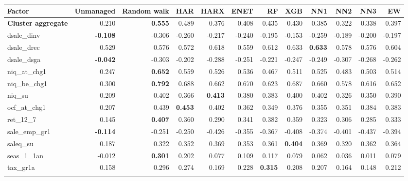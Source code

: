 \begin{landscape}
\begin{longtable}{>{\raggedright\arraybackslash}p{2.6cm}rrrrrrrrrrr}
\hline
Factor & Unmanaged & Random walk & HAR & HARX & ENET & RF & XGB & NN1 & NN2 & NN3 & EW \\
\hline
\textbf{Cluster aggregate} & 0.210 & \textbf{0.555} & 0.489 & 0.376 & 0.408 & 0.435 & 0.430 & 0.385 & 0.322 & 0.338 & 0.397 \\
dsale\_dinv & \textbf{-0.108} & -0.306 & -0.260 & -0.217 & -0.240 & -0.195 & -0.153 & -0.259 & -0.189 & -0.200 & -0.197 \\
dsale\_drec & 0.529 & 0.576 & 0.572 & \cellcolor{blue!10}0.618 & 0.559 & \cellcolor{blue!10}0.612 & \cellcolor{blue!10}0.633 & \textbf{\cellcolor{blue!10}0.633} & \cellcolor{blue!10}0.578 & \cellcolor{blue!10}0.576 & \cellcolor{blue!10}0.604 \\
dsale\_dsga & \textbf{-0.042} & -0.303 & -0.202 & -0.288 & -0.251 & -0.221 & -0.247 & -0.249 & -0.307 & -0.268 & -0.262 \\
niq\_at\_chg1 & 0.247 & \textbf{0.652} & 0.559 & 0.526 & 0.536 & 0.467 & 0.511 & 0.525 & 0.483 & 0.503 & 0.514 \\
niq\_be\_chg1 & 0.300 & \textbf{0.792} & 0.688 & 0.662 & 0.670 & 0.623 & 0.687 & 0.660 & 0.578 & 0.616 & 0.652 \\
niq\_su & 0.209 & 0.402 & 0.366 & \textbf{\cellcolor{blue!10}0.413} & 0.380 & 0.383 & 0.400 & 0.402 & 0.326 & 0.350 & 0.390 \\
ocf\_at\_chg1 & 0.207 & 0.439 & \textbf{\cellcolor{blue!10}0.453} & 0.402 & 0.362 & 0.349 & 0.376 & 0.355 & 0.351 & 0.384 & 0.383 \\
ret\_12\_7 & 0.145 & \textbf{0.407} & 0.360 & 0.290 & 0.341 & 0.382 & 0.359 & 0.323 & 0.306 & 0.285 & 0.333 \\
sale\_emp\_gr1 & \textbf{-0.114} & -0.251 & -0.250 & -0.426 & -0.355 & -0.367 & -0.408 & -0.374 & -0.401 & -0.437 & -0.394 \\
saleq\_su & 0.187 & 0.322 & \cellcolor{blue!10}0.352 & \cellcolor{blue!10}0.369 & \cellcolor{blue!10}0.353 & \cellcolor{blue!10}0.361 & \textbf{\cellcolor{blue!10}0.404} & \cellcolor{blue!10}0.369 & 0.320 & \cellcolor{blue!10}0.362 & \cellcolor{blue!10}0.364 \\
seas\_1\_1an & -0.012 & \textbf{0.301} & 0.202 & 0.077 & 0.109 & 0.117 & 0.079 & 0.062 & 0.036 & 0.011 & 0.079 \\
tax\_gr1a & 0.158 & 0.296 & 0.274 & 0.169 & 0.228 & \textbf{\cellcolor{blue!10}0.315} & 0.208 & 0.207 & 0.164 & 0.148 & 0.212 \\
\hline
\multicolumn{12}{@{}l}{\textit{Panel H. Profitability}} \\

\end{longtable}
\end{landscape}
